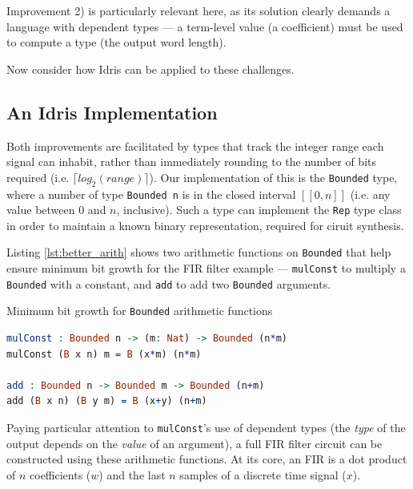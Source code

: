\documentclass[conference]{IEEEtran}
\begin{document}
Improvement 2) is particularly relevant here, as its solution clearly demands a
language with dependent types --- a term-level value (a coefficient) must be
used to compute a type (the output word length).


Now consider how Idris can be applied to these challenges.

\subsection{An Idris Implementation}

Both improvements are facilitated by types that track the integer range each
signal can inhabit, rather than immediately rounding to the number of bits
required (i.e. $\lceil log_2(range) \rceil$). Our implementation of this is the
\texttt{Bounded} type, where a number of type \texttt{Bounded n} is in the
closed interval $[\![0,n]\!]$ (i.e. any value between 0 and $n$, inclusive).
Such a type can implement the \texttt{Rep} type class in order to maintain a
known binary representation, required for ciruit synthesis.

Listing \ref{lst:better_arith} shows two arithmetic functions on
\texttt{Bounded} that help ensure minimum bit growth for the FIR filter example
--- \texttt{mulConst} to multiply a \texttt{Bounded} with a constant, and
\texttt{add} to add two \texttt{Bounded} arguments.

\begin{codefig}[h]
  \caption{Minimum bit growth for \texttt{Bounded} arithmetic functions}
\begin{lstlisting}[language=idris]
mulConst : Bounded n -> (m: Nat) -> Bounded (n*m)
mulConst (B x n) m = B (x*m) (n*m)

add : Bounded n -> Bounded m -> Bounded (n+m)
add (B x n) (B y m) = B (x+y) (n+m)
\end{lstlisting}
\label{lst:better_arith}
\end{codefig}

Paying particular attention to \texttt{mulConst}'s use of dependent types (the
\emph{type} of the output depends on the \emph{value} of an argument), a full
FIR filter circuit can be constructed using these arithmetic functions. At its
core, an FIR is a dot product of $n$ coefficients ($w$) and the last $n$ samples
of a discrete time signal ($x$).
\end{document}
